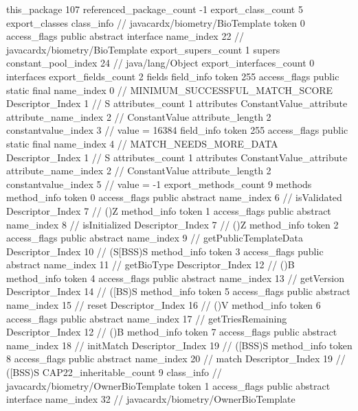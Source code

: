 {{{		}
	}
	this_package	107
	referenced_package_count	-1
	export_class_count	5
	export_classes {
		class_info {		// javacardx/biometry/BioTemplate
			token	0
			access_flags	public abstract interface
			name_index	22		// javacardx/biometry/BioTemplate
			export_supers_count	1
			supers {
				constant_pool_index	24		// java/lang/Object
			}
			export_interfaces_count	0
			interfaces {
			}
			export_fields_count	2
			fields {
			field_info {
				token	255
				access_flags	public static final
				name_index	0		// MINIMUM_SUCCESSFUL_MATCH_SCORE
				Descriptor_Index	1		// S
				attributes_count	1
				attributes {
				ConstantValue_attribute {
					attribute_name_index	2		// ConstantValue
					attribute_length	2
					constantvalue_index	3		// value = 16384
				}
				}
			}
			field_info {
				token	255
				access_flags	public static final
				name_index	4		// MATCH_NEEDS_MORE_DATA
				Descriptor_Index	1		// S
				attributes_count	1
				attributes {
				ConstantValue_attribute {
					attribute_name_index	2		// ConstantValue
					attribute_length	2
					constantvalue_index	5		// value = -1
				}
				}
			}
			}
			export_methods_count	9
			methods {
				method_info {
					token	0
					access_flags	public abstract
					name_index	6		// isValidated
					Descriptor_Index	7		// ()Z
				}
				method_info {
					token	1
					access_flags	public abstract
					name_index	8		// isInitialized
					Descriptor_Index	7		// ()Z
				}
				method_info {
					token	2
					access_flags	public abstract
					name_index	9		// getPublicTemplateData
					Descriptor_Index	10		// (S[BSS)S
				}
				method_info {
					token	3
					access_flags	public abstract
					name_index	11		// getBioType
					Descriptor_Index	12		// ()B
				}
				method_info {
					token	4
					access_flags	public abstract
					name_index	13		// getVersion
					Descriptor_Index	14		// ([BS)S
				}
				method_info {
					token	5
					access_flags	public abstract
					name_index	15		// reset
					Descriptor_Index	16		// ()V
				}
				method_info {
					token	6
					access_flags	public abstract
					name_index	17		// getTriesRemaining
					Descriptor_Index	12		// ()B
				}
				method_info {
					token	7
					access_flags	public abstract
					name_index	18		// initMatch
					Descriptor_Index	19		// ([BSS)S
				}
				method_info {
					token	8
					access_flags	public abstract
					name_index	20		// match
					Descriptor_Index	19		// ([BSS)S
				}
			}
			CAP22_inheritable_count	9
		}
		class_info {		// javacardx/biometry/OwnerBioTemplate
			token	1
			access_flags	public abstract interface
			name_index	32		// javacardx/biometry/OwnerBioTemplate
}}}
